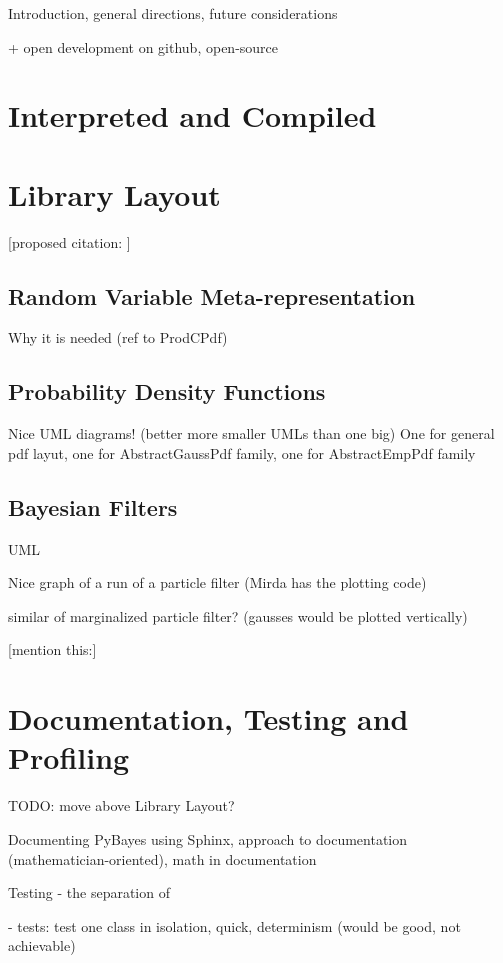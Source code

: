 \documentclass[a4paper,12pt,oneside]{report}
\begin{document}
Introduction, general directions, future considerations

+ open development on github, open-source

\section{Interpreted and Compiled}

\section{Library Layout}

[proposed citation: \cite{Smi:05}]

\subsection{Random Variable Meta-representation}

Why it is needed (ref to ProdCPdf)

\subsection{Probability Density Functions}

Nice UML diagrams! (better more smaller UMLs than one big) One for general pdf layut, one for
AbstractGaussPdf family, one for AbstractEmpPdf family

\subsection{Bayesian Filters}

UML

Nice graph of a run of a particle filter (Mirda has the plotting code)

similar of marginalized particle filter? (gausses would be plotted vertically)

[mention this:\cite{Smi:10}]

\section{Documentation, Testing and Profiling}

TODO: move above Library Layout?

Documenting PyBayes using Sphinx, approach to documentation (mathematician-oriented), math in documentation

Testing - the separation of

- tests: test one class in isolation, quick, determinism (would be good, not achievable)
\end{document}

